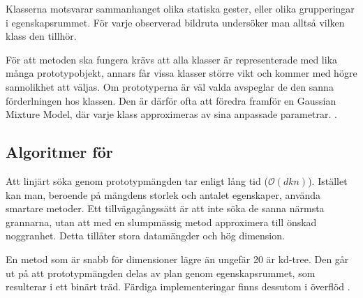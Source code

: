 \documentclass[../rapport_MVEX01-11-05]{subfiles}
\begin{document}
Klasserna motsvarar sammanhanget olika statiska gester,
eller olika grupperingar i egenskapsrummet. För
varje observerad bildruta undersöker man alltså vilken klass den tillhör.

För att metoden ska fungera krävs att alla klasser är representerade med lika
många prototypobjekt, annars får vissa klasser större vikt och kommer med högre
sannolikhet att väljas. Om prototyperna är väl valda avspeglar de den sanna
förderlningen hos klassen.
Den är därför ofta att föredra framför en Gaussian Mixture Model, där
varje klass approximeras av sina anpassade parametrar.
\cite{Hastie09}.

\subsection{Algoritmer för \knn}
Att linjärt söka genom prototypmängden tar enligt
 lång tid ($\mathcal{O}(d k n)$).
Istället kan man, beroende på mängdens storlek och antalet egenskaper,
använda smartare metoder.
Ett tillvägagångssätt är att inte söka de sanna närmsta grannarna,
utan att med en slumpmässig metod approximera till önskad noggranhet.
Detta tillåter stora datamängder och hög dimension.

En metod som är snabb för dimensioner lägre än ungefär 20 är kd-tree.
Den går ut på att prototypmängden delas av plan genom egenskapsrummet,
som resulterar i ett binärt träd. Färdiga implementeringar finns dessutom
i överflöd \cite{Skiena08}.

%

\end{document}
